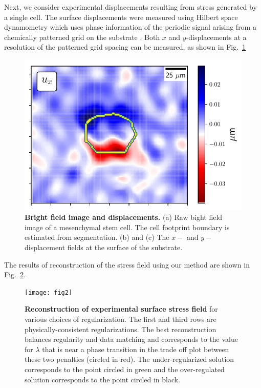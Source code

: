 \documentclass[aps,prl,reprint,twocolumn,groupedaddress,showpacs]{revtex4-1}
\begin{document}
Next, we consider experimental displacements resulting from stress
generated by a single cell. The surface displacements were measured
using Hilbert space dynamometry which uses phase information of the
periodic signal arising from a chemically patterned grid on the
substrate \cite{POPESCU}.  Both $x$ and $y$-displacements at a
resolution of the patterned grid spacing can be measured, as shown in
Fig.~\ref{DATA}

\begin{figure}
\includegraphics[width=\linewidth]{fig0a}
\caption{\textbf{Bright field image and displacements.} (a) Raw bight
  field image of a mesenchymal stem cell. The cell footprint boundary
  is estimated from segmentation. (b) and (c) The $x-$ and
  $y-$displacement fields at the surface of the substrate.}
\label{DATA}
\end{figure}
%
The results of reconstruction of the stress field using our method are
shown in Fig.~\ref{fig:fig2}.

\begin{figure}
\texttt{[image: fig2]}
\caption{\textbf{Reconstruction of experimental surface stress field} for various
  choices of regularization. The first and third rows are
  physically-consistent regularizations. The best reconstruction
  balances regularity and data matching and corresponds to the value
  for $\lambda$ that is near a phase transition in the trade off plot
  between these two penalties (circled in red). The under-regularized
  solution corresponds to the point circled in green and the
  over-regulated solution corresponds to the point circled in black.}
\label{fig:fig2}
\end{figure}
\end{document}
